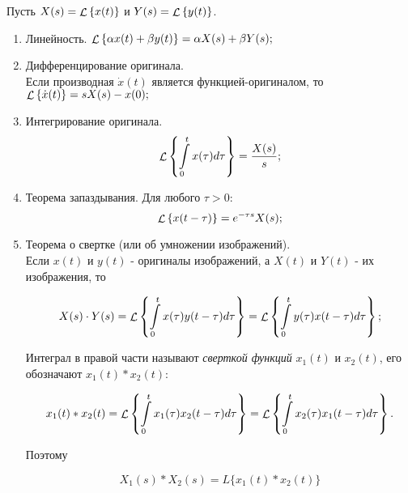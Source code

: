 \documentclass[../../TAU.tex]{subfiles}
\begin{document}
    Пусть 
    $X(s) = \mathop{\mathcal{L}}\nolimits\left\{x(t)\right\}$ и 
    $Y(s) = \mathop{\mathcal{L}}\nolimits\left\{y(t)\right\}$.
    
    \begin{enumerate}
        \item Линейность. $\mathop{\mathcal{L}}\nolimits\left\{\alpha x(t) + \beta y(t)\right\} = \alpha X(s) + \beta Y(s);$
        
        \item Дифференцирование оригинала. \\
            Если производная 
            $\dot x(t)$ 
            является функцией-оригиналом, то 
            $\mathop{\mathcal{L}}\nolimits\left\{\dot x(t)\right\} = sX(s) - x(0);$
        
        \item Интегрирование оригинала.
            \begin{equation}
                \mathop{\mathcal{L}}\nolimits\left\{\int\limits_0^tx(\tau)d\tau\right\} = \frac{X(s)}{s};
            \end{equation}
        
        \item Теорема запаздывания. Для любого $\tau>0$:
            \begin{equation}
                \mathop{\mathcal{L}}\nolimits\left\{x(t-\tau)\right\} = e^{-\tau s}X(s);
            \end{equation}
        
        \item  Теорема о свертке (или об умножении изображений).\\
            Если $x(t)$ и $y(t)$ - оригиналы изображений, а $X(t)$ и $Y(t)$ - их изображения, то
            
            \begin{equation}
                X(s)\cdot Y(s) = \mathop{\mathcal{L}}\nolimits\left\{\int\limits_0^tx(\tau)y(t-\tau)d\tau\right\} = \mathop{\mathcal{L}}\nolimits\left\{\int\limits_0^ty(\tau)x(t-\tau)d\tau\right\};
            \end{equation}
            
            Интеграл в правой части называют {\it сверткой функций} $x_1(t)$ и $x_2(t)$, его обозначают $x_1(t) * x_2(t)$:
            
            \begin{equation}
                x_1(t)*x_2(t) = \mathop{\mathcal{L}}\nolimits\left\{\int\limits_0^t x_1(\tau) x_2(t-\tau) d{\tau}\right\} = \mathop{\mathcal{L}}\nolimits\left\{\int\limits_0^t x_2(\tau) x_1(t-\tau)d\tau\right\}.
            \end{equation}
            
            Поэтому 
            
            \begin{equation}
                X_1(s) * X_2(s) = L\{x_1(t) * x_2(t)\}
            \end{equation}


\end{enumerate}
\end{document}
